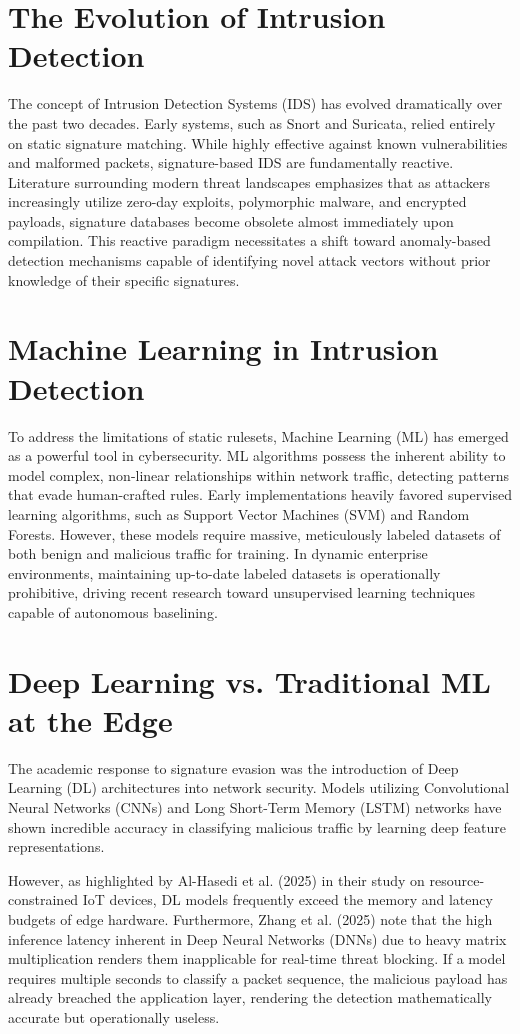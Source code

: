 \documentclass[12pt, a4paper]{report}
\begin{document}
	\section*{The Evolution of Intrusion Detection}
	The concept of Intrusion Detection Systems (IDS) has evolved dramatically over the past two decades. Early systems, such as Snort and Suricata, relied entirely on static signature matching. While highly effective against known vulnerabilities and malformed packets, signature-based IDS are fundamentally reactive. Literature surrounding modern threat landscapes emphasizes that as attackers increasingly utilize zero-day exploits, polymorphic malware, and encrypted payloads, signature databases become obsolete almost immediately upon compilation. This reactive paradigm necessitates a shift toward anomaly-based detection mechanisms capable of identifying novel attack vectors without prior knowledge of their specific signatures.
	
	\section*{Machine Learning in Intrusion Detection}
	To address the limitations of static rulesets, Machine Learning (ML) has emerged as a powerful tool in cybersecurity. ML algorithms possess the inherent ability to model complex, non-linear relationships within network traffic, detecting patterns that evade human-crafted rules. Early implementations heavily favored supervised learning algorithms, such as Support Vector Machines (SVM) and Random Forests. However, these models require massive, meticulously labeled datasets of both benign and malicious traffic for training. In dynamic enterprise environments, maintaining up-to-date labeled datasets is operationally prohibitive, driving recent research toward unsupervised learning techniques capable of autonomous baselining.
	
	\section*{Deep Learning vs. Traditional ML at the Edge}
	The academic response to signature evasion was the introduction of Deep Learning (DL) architectures into network security. Models utilizing Convolutional Neural Networks (CNNs) and Long Short-Term Memory (LSTM) networks have shown incredible accuracy in classifying malicious traffic by learning deep feature representations. 
	
	However, as highlighted by Al-Hasedi et al. (2025) in their study on resource-constrained IoT devices, DL models frequently exceed the memory and latency budgets of edge hardware. Furthermore, Zhang et al. (2025) note that the high inference latency inherent in Deep Neural Networks (DNNs) due to heavy matrix multiplication renders them inapplicable for real-time threat blocking. If a model requires multiple seconds to classify a packet sequence, the malicious payload has already breached the application layer, rendering the detection mathematically accurate but operationally useless.
	
\end{document}
